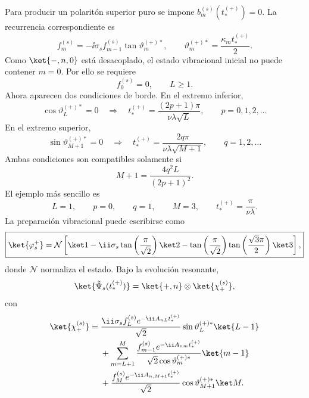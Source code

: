 Para producir un polarit\'on superior puro se impone
$b_m^{(s)}(t_*^{(+)})=0$. La recurrencia correspondiente es
\begin{equation}
  \boxed{
  f_m^{(s)}
  =
  -\ii\sigma_s f_{m-1}^{(s)}
  \tan\vartheta_m^{(+)*},
  \qquad
  \vartheta_m^{(+)*}
  =
  \frac{\kappa_m t_*^{(+)}}{2}.
  }
\end{equation}
Como $\ket{-,n,0}$ est\'a desacoplado, el estado vibracional inicial no puede
contener $m=0$. Por ello se requiere
\begin{equation}
  f_0^{(s)}=0,
  \qquad
  L\geq1.
\end{equation}
Ahora aparecen dos condiciones de borde. En el extremo inferior,
\begin{equation}
  \cos\vartheta_L^{(+)*}=0
  \quad\Longrightarrow\quad
  t_*^{(+)}
  =
  \frac{(2p+1)\pi}{\nu\lambda\sqrt L},
  \qquad p=0,1,2,\ldots
\end{equation}
En el extremo superior,
\begin{equation}
  \sin\vartheta_{M+1}^{(+)*}=0
  \quad\Longrightarrow\quad
  t_*^{(+)}
  =
  \frac{2q\pi}{\nu\lambda\sqrt{M+1}},
  \qquad q=1,2,\ldots
\end{equation}
Ambas condiciones son compatibles solamente si
\begin{equation}
  \boxed{
  M+1
  =
  \frac{4q^2L}{(2p+1)^2}.
  }
\end{equation}
El ejemplo m\'as sencillo es
\begin{equation}
  L=1,
  \qquad
  p=0,
  \qquad
  q=1,
  \qquad
  M=3,
  \qquad
  t_*^{(+)}=\frac{\pi}{\nu\lambda}.
\end{equation}
La preparaci\'on vibracional puede escribirse como
\begin{equation}
  \boxed{
  \ket{\varphi_s^{+}}
  =
  \mathcal N
  \left[
  \ket1
  -\ii\sigma_s\tan\left(\frac{\pi}{\sqrt2}\right)\ket2
  -\tan\left(\frac{\pi}{\sqrt2}\right)
  \tan\left(\frac{\sqrt3\pi}{2}\right)\ket3
  \right],
  }
\end{equation}
donde $\mathcal N$ normaliza el estado. Bajo la evoluci\'on resonante,
\begin{equation}
  \ket{\tilde\Psi_s(t_*^{(+)})}
  =
  \ket{+,n}\otimes\ket{\chi_+^{(s)}},
\end{equation}
con
\begin{equation}
\begin{aligned}
  \ket{\chi_+^{(s)}}
  ={}&
  \frac{\ii\sigma_s f_L^{(s)}e^{-\ii A_{nL}t_*^{(+)}}}{\sqrt2}
  \sin\vartheta_L^{(+)*}\ket{L-1}
  \\
  &+
  \sum_{m=L+1}^{M}
  \frac{f_{m-1}^{(s)}e^{-\ii A_{nm}t_*^{(+)}}}
  {\sqrt2\cos\vartheta_m^{(+)*}}\ket{m-1}
  \\
  &+
  \frac{f_M^{(s)}e^{-\ii A_{n,M+1}t_*^{(+)}}}{\sqrt2}
  \cos\vartheta_{M+1}^{(+)*}\ket M.
\end{aligned}
\end{equation}

